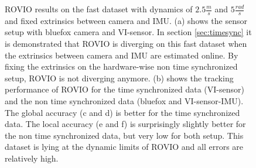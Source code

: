 \begin{figure}[h]
\begin{subfigure}[b]{0.42\textwidth}
    \caption{}
  \end{subfigure}
   \caption{ROVIO results on the fast dataset with dynamics of $2.5\frac{m}{s}$ and $5\frac{rad}{s}$ and fixed extrinsics between camera and IMU. (a) shows the sensor setup with bluefox camera and VI-sensor. In section \ref{sec:timesync} it is demonstrated that ROVIO is diverging on this fast dataset when the extrinsics between camera and IMU are estimated online. By fixing the extrinsics on the hardware-wise non time synchronized setup, ROVIO is not diverging anymore. (b) shows the tracking performance of ROVIO for the time synchronized data (VI-sensor) and the non time synchronized data (bluefox and VI-sensor-IMU). The global accuracy (c and d) is better for the time synchronized data. The local accuracy (e and f) is surprisingly slightly better for the non time synchronized data, but very low for both setup. This dataset is lying at the dynamic limits of ROVIO and all errors are relatively high.}
   \label{pics:appendix_fast}
\end{figure}